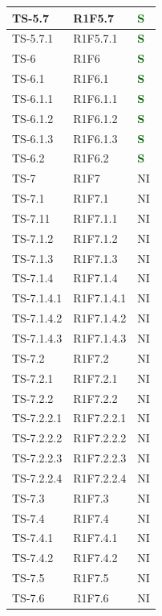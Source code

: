\begin{longtable}{|C{2.5cm}|C{2.5cm}|C{2.5cm}|}
	\hline
	{TS-5.7} & {R1F5.7} & \textcolor{darkgreen}{\textbf{S}}\\
	\hline
	{TS-5.7.1} & {R1F5.7.1} & \textcolor{darkgreen}{\textbf{S}}\\
	\hline
	{TS-6} & {R1F6} & \textcolor{darkgreen}{\textbf{S}}\\
	\hline
	{TS-6.1} & {R1F6.1} & \textcolor{darkgreen}{\textbf{S}}\\
	\hline
	{TS-6.1.1} & {R1F6.1.1} & \textcolor{darkgreen}{\textbf{S}}\\
	\hline
	{TS-6.1.2} & {R1F6.1.2} & \textcolor{darkgreen}{\textbf{S}}\\
	\hline
	{TS-6.1.3} & {R1F6.1.3}  & \textcolor{darkgreen}{\textbf{S}}\\
	\hline
	{TS-6.2} & {R1F6.2} & \textcolor{darkgreen}{\textbf{S}}\\
	\hline
	{TS-7} & {R1F7} & {NI}\\
	\hline
	{TS-7.1} & {R1F7.1} & {NI}\\
	\hline
	{TS-7.11} & {R1F7.1.1} & {NI}\\
	\hline
	{TS-7.1.2} & {R1F7.1.2} & {NI}\\
	\hline
	{TS-7.1.3} & {R1F7.1.3} & {NI}\\
	\hline
	{TS-7.1.4} & {R1F7.1.4} & {NI}\\
	\hline
	{TS-7.1.4.1} & {R1F7.1.4.1} & {NI}\\
	\hline
	{TS-7.1.4.2} & {R1F7.1.4.2} & {NI}\\
	\hline
	{TS-7.1.4.3} & {R1F7.1.4.3} & {NI}\\
	\hline
	{TS-7.2} & {R1F7.2} & {NI}\\
	\hline
	{TS-7.2.1} & {R1F7.2.1} & {NI}\\
	\hline
	{TS-7.2.2} & {R1F7.2.2} & {NI}\\
	\hline
	{TS-7.2.2.1} & {R1F7.2.2.1} & {NI}\\
	\hline
	{TS-7.2.2.2} & {R1F7.2.2.2} & {NI}\\
	\hline
	{TS-7.2.2.3} & {R1F7.2.2.3} & {NI}\\
	\hline
	{TS-7.2.2.4} & {R1F7.2.2.4} & {NI}\\
	\hline
	{TS-7.3} & {R1F7.3} & {NI}\\
	\hline
	{TS-7.4} & {R1F7.4} & {NI}\\
	\hline
	{TS-7.4.1} & {R1F7.4.1} & {NI}\\
	\hline
	{TS-7.4.2} & {R1F7.4.2} & {NI}\\
	\hline
	{TS-7.5} & {R1F7.5} & {NI}\\
	\hline
	{TS-7.6} & {R1F7.6} & {NI}\\

\end{longtable}
